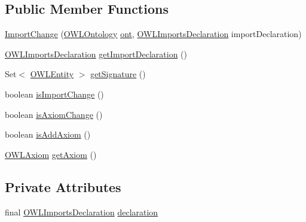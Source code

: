 \subsection*{Public Member Functions}
\begin{DoxyCompactItemize}
\item 
\hyperlink{classorg_1_1semanticweb_1_1owlapi_1_1model_1_1_import_change_a47a2179c9e17b4261101b0a3ae1a612c}{Import\-Change} (\hyperlink{interfaceorg_1_1semanticweb_1_1owlapi_1_1model_1_1_o_w_l_ontology}{O\-W\-L\-Ontology} \hyperlink{classorg_1_1semanticweb_1_1owlapi_1_1model_1_1_o_w_l_ontology_change_a9b8b64f1cab33aae500db20e19186211}{ont}, \hyperlink{interfaceorg_1_1semanticweb_1_1owlapi_1_1model_1_1_o_w_l_imports_declaration}{O\-W\-L\-Imports\-Declaration} import\-Declaration)
\item 
\hyperlink{interfaceorg_1_1semanticweb_1_1owlapi_1_1model_1_1_o_w_l_imports_declaration}{O\-W\-L\-Imports\-Declaration} \hyperlink{classorg_1_1semanticweb_1_1owlapi_1_1model_1_1_import_change_a7817589be06c7534c09bc4ac68d86146}{get\-Import\-Declaration} ()
\item 
Set$<$ \hyperlink{interfaceorg_1_1semanticweb_1_1owlapi_1_1model_1_1_o_w_l_entity}{O\-W\-L\-Entity} $>$ \hyperlink{classorg_1_1semanticweb_1_1owlapi_1_1model_1_1_import_change_aa6eca65e34ca9e4dfe76cca3daf322b1}{get\-Signature} ()
\item 
boolean \hyperlink{classorg_1_1semanticweb_1_1owlapi_1_1model_1_1_import_change_a0214a415c37708a0a65d8adbeef57f6b}{is\-Import\-Change} ()
\item 
boolean \hyperlink{classorg_1_1semanticweb_1_1owlapi_1_1model_1_1_import_change_a345c0805d65b79f4065ee8871ac3c111}{is\-Axiom\-Change} ()
\item 
boolean \hyperlink{classorg_1_1semanticweb_1_1owlapi_1_1model_1_1_import_change_aa6c8dad427933ff68b0da2eaa40a3cb3}{is\-Add\-Axiom} ()
\item 
\hyperlink{interfaceorg_1_1semanticweb_1_1owlapi_1_1model_1_1_o_w_l_axiom}{O\-W\-L\-Axiom} \hyperlink{classorg_1_1semanticweb_1_1owlapi_1_1model_1_1_import_change_a503ece10f235898a0f08681b91dc4940}{get\-Axiom} ()
\end{DoxyCompactItemize}
\subsection*{Private Attributes}
\begin{DoxyCompactItemize}
\item 
final \hyperlink{interfaceorg_1_1semanticweb_1_1owlapi_1_1model_1_1_o_w_l_imports_declaration}{O\-W\-L\-Imports\-Declaration} \hyperlink{classorg_1_1semanticweb_1_1owlapi_1_1model_1_1_import_change_ae1d55556744f5e6c159478874970bd41}{declaration}
\end{DoxyCompactItemize}


